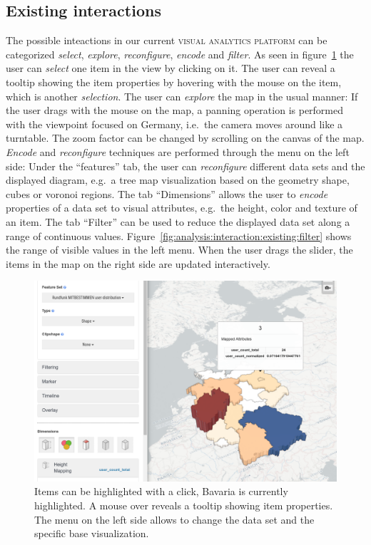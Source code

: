 \documentclass{article}
\newcommand{\visan}{\textsc{visual analytics platform}}
\begin{document}
\subsection{Existing interactions}
The possible inteactions in our current \visan{} can be categorized \emph{select}, \emph{explore}, \emph{reconfigure}, \emph{encode} and \emph{filter}.
As seen in figure~\ref{fig:analysis:interaction:existing} the user can \emph{select} one item in the view by clicking on it.
The user can reveal a tooltip showing the item properties by hovering with the mouse on the item, which is another \emph{selection}.
The user can \emph{explore} the map in the usual manner:
If the user drags with the mouse on the map, a panning operation is performed with the viewpoint focused on Germany, i.e.\ the camera moves around like a turntable.
The zoom factor can be changed by scrolling on the canvas of the map.
\emph{Encode} and \emph{reconfigure} techniques are performed through the menu on the left side:
Under the ``features'' tab, the user can \emph{reconfigure} different data sets and the displayed diagram, e.g.\ a tree map visualization based on the geometry shape, cubes or voronoi regions.
The tab ``Dimensions'' allows the user to \emph{encode} properties of a data set to visual attributes, e.g.\ the height, color and texture of an item.
The tab ``Filter'' can be used to reduce the displayed data set along a range of continuous values.
Figure~\ref{fig:analysis:interaction:existing:filter} shows the range of visible values in the left menu.
When the user drags the slider, the items in the map on the right side are updated interactively.

\begin{figure}[h!]
  \centering
  \includegraphics[width=\textwidth]{images/existing-interactions.png}
  \caption{
    Items can be highlighted with a click, Bavaria is currently highlighted.
    A mouse over reveals a tooltip showing item properties.
    The menu on the left side allows to change the data set and the specific base visualization.}
  \label{fig:analysis:interaction:existing}
\end{figure}
\end{document}
